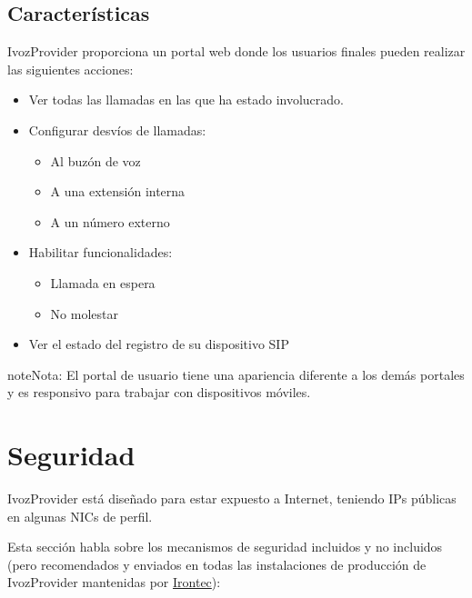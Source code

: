 \documentclass[letterpaper,10pt,spanish]{sphinxmanual}
\begin{document}
\section{Características}
\label{user_portal/features::doc}\label{user_portal/features:features}
IvozProvider proporciona un portal web donde los usuarios finales pueden realizar las siguientes acciones:
\begin{itemize}
\item {} 
Ver todas las llamadas en las que ha estado involucrado.

\item {} 
Configurar desvíos de llamadas:
\begin{itemize}
\item {} 
Al buzón de voz

\item {} 
A una extensión interna

\item {} 
A un número externo

\end{itemize}

\item {} 
Habilitar funcionalidades:
\begin{itemize}
\item {} 
Llamada en espera

\item {} 
No molestar

\end{itemize}

\item {} 
Ver el estado del registro de su dispositivo SIP

\end{itemize}

\begin{notice}{note}{Nota:}
El portal de usuario tiene una apariencia diferente a los demás portales y es responsivo para trabajar con dispositivos móviles.
\end{notice}


\chapter{Seguridad}
\label{security_and_maintenance/security/index:security}\label{security_and_maintenance/security/index::doc}\label{security_and_maintenance/security/index:id1}
IvozProvider está diseñado para estar expuesto a Internet, teniendo IPs públicas en algunas NICs de perfil.

Esta sección habla sobre los mecanismos de seguridad incluidos y no incluidos (pero recomendados y enviados en todas las instalaciones de producción de IvozProvider mantenidas por \href{https://www.irontec.com}{Irontec}):
\end{document}
